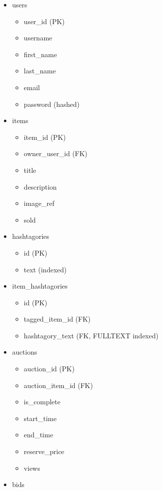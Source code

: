 \begin{itemize}
\tightlist
\item
  users

  \begin{itemize}
  \tightlist
  \item
    user\_id (PK)
  \item
    username
  \item
    first\_name
  \item
    last\_name
  \item
    email
  \item
    password (hashed)
  \end{itemize}
\item
  items

  \begin{itemize}
  \tightlist
  \item
    item\_id (PK)
  \item
    owner\_user\_id (FK)
  \item
    title
  \item
    description
  \item
    image\_ref
  \item
    sold
  \end{itemize}
\item
  hashtagories

  \begin{itemize}
  \tightlist
  \item
    id (PK)
  \item
    text (indexed)
  \end{itemize}
\item
  item\_hashtagories

  \begin{itemize}
  \tightlist
  \item
    id (PK)
  \item
    tagged\_item\_id (FK)
  \item
    hashtagory\_text (FK, FULLTEXT indexed)
  \end{itemize}
\item
  auctions

  \begin{itemize}
  \tightlist
  \item
    auction\_id (PK)
  \item
    auction\_item\_id (FK)
  \item
    is\_complete
  \item
    start\_time
  \item
    end\_time
  \item
    reserve\_price
  \item
    views
  \end{itemize}
\item
  bids


\end{itemize}
